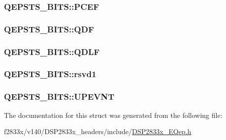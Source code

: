 \subsubsection[{P\+C\+E\+F}]{ Q\+E\+P\+S\+T\+S\+\_\+\+B\+I\+T\+S\+::\+P\+C\+E\+F}\label{struct_q_e_p_s_t_s___b_i_t_s_a88c6d2960f4a2abd796907553a4a9df7}
\hypertarget{struct_q_e_p_s_t_s___b_i_t_s_a623d6a4592f51d93a8f58f76ddf8f041}{}
\subsubsection[{Q\+D\+F}]{ Q\+E\+P\+S\+T\+S\+\_\+\+B\+I\+T\+S\+::\+Q\+D\+F}\label{struct_q_e_p_s_t_s___b_i_t_s_a623d6a4592f51d93a8f58f76ddf8f041}
\hypertarget{struct_q_e_p_s_t_s___b_i_t_s_aad27f808c4e21d5bb9bf7054702090be}{}
\subsubsection[{Q\+D\+L\+F}]{ Q\+E\+P\+S\+T\+S\+\_\+\+B\+I\+T\+S\+::\+Q\+D\+L\+F}\label{struct_q_e_p_s_t_s___b_i_t_s_aad27f808c4e21d5bb9bf7054702090be}
\hypertarget{struct_q_e_p_s_t_s___b_i_t_s_a67721f711d89ea7fce60b09b795835e5}{}
\subsubsection[{rsvd1}]{ Q\+E\+P\+S\+T\+S\+\_\+\+B\+I\+T\+S\+::rsvd1}\label{struct_q_e_p_s_t_s___b_i_t_s_a67721f711d89ea7fce60b09b795835e5}
\hypertarget{struct_q_e_p_s_t_s___b_i_t_s_a70a730f0ccf3e87297a407d4eaf92abb}{}
\subsubsection[{U\+P\+E\+V\+N\+T}]{ Q\+E\+P\+S\+T\+S\+\_\+\+B\+I\+T\+S\+::\+U\+P\+E\+V\+N\+T}\label{struct_q_e_p_s_t_s___b_i_t_s_a70a730f0ccf3e87297a407d4eaf92abb}


The documentation for this struct was generated from the following file\+:\begin{DoxyCompactItemize}
\item 
f2833x/v140/\+D\+S\+P2833x\+\_\+headers/include/\hyperlink{_d_s_p2833x___e_qep_8h}{D\+S\+P2833x\+\_\+\+E\+Qep.\+h}\end{DoxyCompactItemize}
